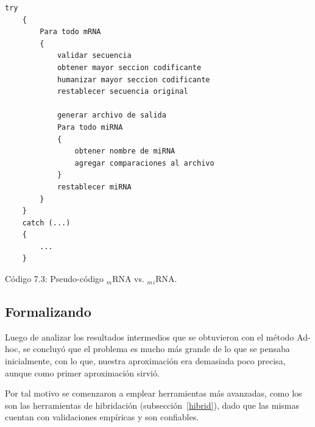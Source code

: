 \begin{minipage}{\linewidth}
	\begin{lstlisting}[basicstyle=\tt, frame=trBL, tabsize=4,fontadjust=true]
	try
	{
		Para todo mRNA
		{
			validar secuencia
			obtener mayor seccion codificante
			humanizar mayor seccion codificante
			restablecer secuencia original

			generar archivo de salida
			Para todo miRNA
			{
				obtener nombre de miRNA
				agregar comparaciones al archivo
			}
			restablecer miRNA
		}
	}
	catch (...)
	{
		...
	}
	\end{lstlisting}
\end{minipage}
\hspace*{3cm}\caption{Código 7.3: Pseudo-código $_m$RNA vs. $_m$$_i$RNA.}

\subsection{Formalizando}
\par Luego de analizar los resultados intermedios que se obtuvieron con el método Ad-hoc, se concluyó que el problema es mucho más grande de lo que se pensaba inicialmente, con lo que, nuestra aproximación era demasiada poco precisa, aunque como primer aproximación sirvió. 
\par Por tal motivo se comenzaron a emplear herramientas más avanzadas, como los son las herramientas de hibridación (subsección~\ref{hibrid}), dado que las mismas cuentan con validaciones empíricas y son confiables.

